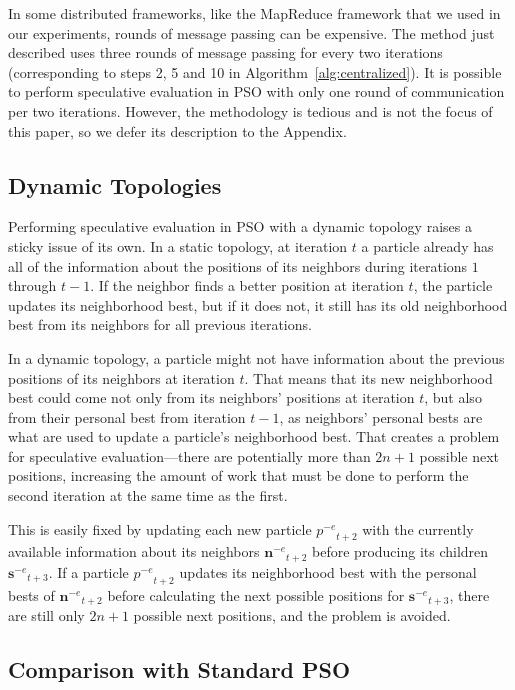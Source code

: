 \documentclass[journal,letterpaper]{IEEEtran}
\newcommand{\alg}[1]{Algorithm~\ref{alg:#1}}
\providecommand{\noeval}[1]{\ensuremath{#1^{-e}}}
\providecommand{\p}{\ensuremath{p}}
\providecommand{\sset}{\ensuremath{\mathbf{s}}}
\providecommand{\nset}{\ensuremath{\mathbf{n}}}
\begin{document}
In some distributed frameworks, like the MapReduce framework that we used in
our experiments, rounds of message passing can be expensive.  The method just
described uses three rounds of message passing for every two iterations
(corresponding to steps 2, 5 and 10 in \alg{centralized}).  It is possible to
perform speculative evaluation in PSO with only one round of communication per
two iterations.  However, the methodology is tedious and is not the focus of
this paper, so we defer its description to the Appendix.

\subsection{Dynamic Topologies}

Performing speculative evaluation in PSO with a dynamic topology raises a
sticky issue of its own.  In a static topology, at iteration $t$ a particle
already has all of the information about the positions of its neighbors during
iterations $1$ through $t-1$.  If the neighbor finds a better position at
iteration $t$, the particle updates its neighborhood best, but if it does not,
it still has its old neighborhood best from its neighbors for all previous
iterations.

In a dynamic topology, a particle might not have information about the previous
positions of its neighbors at iteration $t$.  That means that its new
neighborhood best could come not only from its neighbors' positions at
iteration $t$, but also from their personal best from iteration $t-1$, as
neighbors' personal bests are what are used to update a particle's neighborhood
best.  That creates a problem for speculative evaluation---there are
potentially more than $2n+1$ possible next positions, increasing the amount of
work that must be done to perform the second iteration at the same time as the
first.

This is easily fixed by updating each new particle $\noeval{\p}_{t+2}$ with the
currently available information about its neighbors $\noeval{\nset}_{t+2}$
before producing its children $\noeval{\sset}_{t+3}$.  If a particle
$\noeval{\p}_{t+2}$ updates its neighborhood best with the personal bests of
$\noeval{\nset}_{t+2}$ before calculating the next possible positions for
$\noeval{\sset}_{t+3}$, there are still only $2n+1$ possible next positions,
and the problem is avoided.

\subsection{Comparison with Standard PSO}
\label{sec:results}
\end{document}
